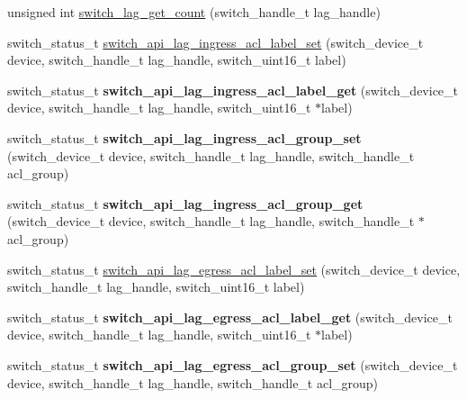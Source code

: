 \begin{DoxyCompactItemize}
\item 
unsigned int \hyperlink{group__LAG_ga8f9e09eaf138732eccd33c8ea472efbb}{switch\+\_\+lag\+\_\+get\+\_\+count} (switch\+\_\+handle\+\_\+t lag\+\_\+handle)
\item 
switch\+\_\+status\+\_\+t \hyperlink{group__LAG_gace75f6f21942f9e8ad611861ec60c2e2}{switch\+\_\+api\+\_\+lag\+\_\+ingress\+\_\+acl\+\_\+label\+\_\+set} (switch\+\_\+device\+\_\+t device, switch\+\_\+handle\+\_\+t lag\+\_\+handle, switch\+\_\+uint16\+\_\+t label)
\item 
\hypertarget{group__LAG_ga4edb2dde25b4f420076d2b5f1681f3ce}{switch\+\_\+status\+\_\+t {\bfseries switch\+\_\+api\+\_\+lag\+\_\+ingress\+\_\+acl\+\_\+label\+\_\+get} (switch\+\_\+device\+\_\+t device, switch\+\_\+handle\+\_\+t lag\+\_\+handle, switch\+\_\+uint16\+\_\+t $\ast$label)}\label{group__LAG_ga4edb2dde25b4f420076d2b5f1681f3ce}

\item 
\hypertarget{group__LAG_ga9fb44dabc7f7083c144c711e2ab5e209}{switch\+\_\+status\+\_\+t {\bfseries switch\+\_\+api\+\_\+lag\+\_\+ingress\+\_\+acl\+\_\+group\+\_\+set} (switch\+\_\+device\+\_\+t device, switch\+\_\+handle\+\_\+t lag\+\_\+handle, switch\+\_\+handle\+\_\+t acl\+\_\+group)}\label{group__LAG_ga9fb44dabc7f7083c144c711e2ab5e209}

\item 
\hypertarget{group__LAG_gabcdf8a918c9691004bcedb925ab95eec}{switch\+\_\+status\+\_\+t {\bfseries switch\+\_\+api\+\_\+lag\+\_\+ingress\+\_\+acl\+\_\+group\+\_\+get} (switch\+\_\+device\+\_\+t device, switch\+\_\+handle\+\_\+t lag\+\_\+handle, switch\+\_\+handle\+\_\+t $\ast$acl\+\_\+group)}\label{group__LAG_gabcdf8a918c9691004bcedb925ab95eec}

\item 
switch\+\_\+status\+\_\+t \hyperlink{group__LAG_ga44dad3b6476dd54f3c8bc71352163a21}{switch\+\_\+api\+\_\+lag\+\_\+egress\+\_\+acl\+\_\+label\+\_\+set} (switch\+\_\+device\+\_\+t device, switch\+\_\+handle\+\_\+t lag\+\_\+handle, switch\+\_\+uint16\+\_\+t label)
\item 
\hypertarget{group__LAG_gab2e5bcb0198f37a46a5ebdc20566333e}{switch\+\_\+status\+\_\+t {\bfseries switch\+\_\+api\+\_\+lag\+\_\+egress\+\_\+acl\+\_\+label\+\_\+get} (switch\+\_\+device\+\_\+t device, switch\+\_\+handle\+\_\+t lag\+\_\+handle, switch\+\_\+uint16\+\_\+t $\ast$label)}\label{group__LAG_gab2e5bcb0198f37a46a5ebdc20566333e}

\item 
\hypertarget{group__LAG_gabc8681f79d7f2d4dfda77af07e73790e}{switch\+\_\+status\+\_\+t {\bfseries switch\+\_\+api\+\_\+lag\+\_\+egress\+\_\+acl\+\_\+group\+\_\+set} (switch\+\_\+device\+\_\+t device, switch\+\_\+handle\+\_\+t lag\+\_\+handle, switch\+\_\+handle\+\_\+t acl\+\_\+group)}\label{group__LAG_gabc8681f79d7f2d4dfda77af07e73790e}


\end{DoxyCompactItemize}
